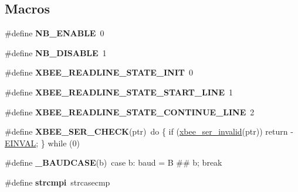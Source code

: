 \subsection*{Macros}
\begin{DoxyCompactItemize}
\item 
\mbox{\label{group__hal__posix_ga3fb2b4e9c5df4d26c14bfcd77eded216}} 
\#define {\bfseries N\+B\+\_\+\+E\+N\+A\+B\+LE}~0
\item 
\mbox{\label{group__hal__posix_ga41927446ed98bfbdcdb72ec0906f413d}} 
\#define {\bfseries N\+B\+\_\+\+D\+I\+S\+A\+B\+LE}~1
\item 
\mbox{\label{group__hal__posix_ga029adc5ad3f556e4c5671b21529c0dd1}} 
\#define {\bfseries X\+B\+E\+E\+\_\+\+R\+E\+A\+D\+L\+I\+N\+E\+\_\+\+S\+T\+A\+T\+E\+\_\+\+I\+N\+IT}~0
\item 
\mbox{\label{group__hal__posix_gaa3a6d3307bf92060ea7c2664dc9e7b6b}} 
\#define {\bfseries X\+B\+E\+E\+\_\+\+R\+E\+A\+D\+L\+I\+N\+E\+\_\+\+S\+T\+A\+T\+E\+\_\+\+S\+T\+A\+R\+T\+\_\+\+L\+I\+NE}~1
\item 
\mbox{\label{group__hal__posix_ga5eb45373870b820af1c6c5d2918ee9c1}} 
\#define {\bfseries X\+B\+E\+E\+\_\+\+R\+E\+A\+D\+L\+I\+N\+E\+\_\+\+S\+T\+A\+T\+E\+\_\+\+C\+O\+N\+T\+I\+N\+U\+E\+\_\+\+L\+I\+NE}~2
\item 
\mbox{\label{group__hal__posix_ga755b7e850db6200a6f43b741c678ae53}} 
\#define {\bfseries X\+B\+E\+E\+\_\+\+S\+E\+R\+\_\+\+C\+H\+E\+CK}(ptr)~do \{ if (\hyperlink{group__xbee__serial_gae7f838b59f553507bf81a86042fe9cd7}{xbee\+\_\+ser\+\_\+invalid}(ptr)) return -\/\hyperlink{group__hal_ga2d1678d5a7cc8ce499643f3b8957def4}{E\+I\+N\+V\+AL}; \} while (0)
\item 
\mbox{\label{group__hal__posix_ga83470a31d4cbec51bad9537a7a1f20b8}} 
\#define {\bfseries \+\_\+\+B\+A\+U\+D\+C\+A\+SE}(b)~case b\+: baud = B \#\# b; break
\item 
\mbox{\label{group__hal__posix_gacf1a32c487efc5306d57219a57d57b60}} 
\#define {\bfseries strcmpi}~strcasecmp
\item 

\end{DoxyCompactItemize}
